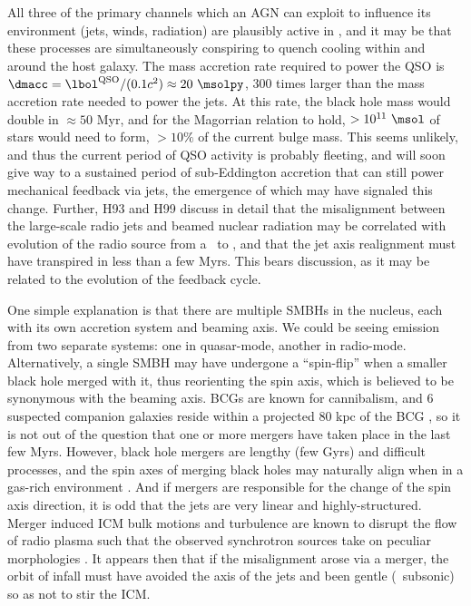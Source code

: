 \documentclass[useAMS,usenatbib]{mn2e}
\begin{document}
All three of the primary channels which an AGN can exploit to
influence its environment (jets, winds, radiation) are plausibly
active in \irs, and it may be that these processes are simultaneously
conspiring to quench cooling within and around the host galaxy. The
mass accretion rate required to power the QSO is $\dmacc = \lqso/(0.1
c^2) \approx 20 ~\msolpy$, 300 times larger than the mass accretion
rate needed to power the jets. At this rate, the black hole mass would
double in $\approx 50$ Myr, and for the Magorrian relation to hold, $>
10^{11} ~\msol$ of stars would need to form, $> 10\%$ of the current
bulge mass. This seems unlikely, and thus the current period of QSO
activity is probably fleeting, and will soon give way to a sustained
period of sub-Eddington accretion that can still power mechanical
feedback via jets, the emergence of which may have signaled this
change. Further, H93 and H99 discuss in detail that the misalignment
between the large-scale radio jets and beamed nuclear radiation may be
correlated with evolution of the radio source from a \frii\ to \fri,
and that the jet axis realignment must have transpired in less than a
few Myrs. This bears discussion, as it may be related to the evolution
of the feedback cycle.

One simple explanation is that there are multiple SMBHs in the
nucleus, each with its own accretion system and beaming axis. We could
be seeing emission from two separate systems: one in quasar-mode,
another in radio-mode. Alternatively, a single SMBH may have undergone
a ``spin-flip'' \citep{2002Sci...297.1310M} when a smaller black hole
merged with it, thus reorienting the spin axis, which is believed to
be synonymous with the beaming axis. BCGs are known for cannibalism,
and 6 suspected companion galaxies reside within a projected 80 kpc of
the BCG \citep{1996AJ....111..649S, 1999Ap&SS.266..113A}, so it is not
out of the question that one or more mergers have taken place in the
last few Myrs. However, black hole mergers are lengthy (few Gyrs) and
difficult processes, and the spin axes of merging black holes may
naturally align when in a gas-rich environment
\citep{2007ApJ...661L.147B}. And if mergers are responsible for the
change of the spin axis direction, it is odd that the jets are very
linear and highly-structured. Merger induced ICM bulk motions and
turbulence are known to disrupt the flow of radio plasma such that the
observed synchrotron sources take on peculiar morphologies
\citep[\eg][]{2009A&A...495..721S, 2010arXiv1002.0395S}. It appears
then that if the misalignment arose via a merger, the orbit of infall
must have avoided the axis of the jets and been gentle (\ie\ subsonic)
so as not to stir the ICM.
\end{document}
